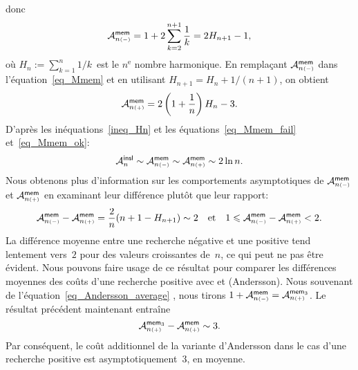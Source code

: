 donc
\begin{equation}
\abovedisplayskip=-6pt
\abovedisplayshortskip=-6pt
\M{\fun{mem}}{n{\scriptscriptstyle (-)}} =
1 + 2 \sum_{k=2}^{n+1}\frac{1}{k} = 2H_{n+1} - 1,
\index{mem@$\M{\fun{mem}}{n{\scriptscriptstyle (-)}}$}
\label{eq_Mmem_fail}
\end{equation}
où \(H_n := \sum_{k=1}^{n}1/k\)~est le \(n^\text{e}\) nombre
harmonique. En remplaçant
\(\M{\fun{mem}}{n{\scriptscriptstyle (-)}}\) dans
l'équation~\eqref{eq_Mmem} et en utilisant \(H_{n+1} = H_n +
1/(n+1)\), on obtient
\begin{equation}
\M{\fun{mem}}{n{\scriptscriptstyle (+)}} =
2\left(1+\frac{1}{n}\right)H_n - 3.
\index{mem@$\M{\fun{mem}}{n{\scriptscriptstyle (+)}}$}
\label{eq_Mmem_ok}
\end{equation}
D'après les inéquations~\eqref{ineq_Hn}  et
les équations~\eqref{eq_Mmem_fail} et~\eqref{eq_Mmem_ok}:
\begin{equation*}
\M{\fun{insl}}{n}
\sim \M{\fun{mem}}{n{\scriptscriptstyle (-)}}
\sim \M{\fun{mem}}{n{\scriptscriptstyle (+)}} \sim 2 \ln n.
\end{equation*}
Nous obtenons plus d'information sur les comportements asymptotiques
de \(\M{\fun{mem}}{n{\scriptscriptstyle(-)}}\) et
\(\M{\fun{mem}}{n{\scriptscriptstyle(+)}}\) en examinant leur
différence plutôt que leur rapport:
\begin{equation*}
\M{\fun{mem}}{n{\scriptscriptstyle (-)}} -
\M{\fun{mem}}{n{\scriptscriptstyle (+)}} =
\frac{2}{n}(n + 1 - H_{n+1}) \sim 2
\quad\text{et}\quad
1 \leqslant \M{\fun{mem}}{n{\scriptscriptstyle (-)}} -
\M{\fun{mem}}{n{\scriptscriptstyle (+)}} < 2.
\end{equation*}
La différence moyenne entre une recherche négative et une positive
tend lentement vers~\(2\) pour des valeurs croissantes de~\(n\), ce
qui peut ne pas être évident. Nous pouvons faire usage de ce résultat
pour comparer les différences moyennes des coûts d'une recherche
positive avec  et  (Andersson). Nous
souvenant de l'équation~\eqref{eq_Andersson_average}
, nous tirons \(1 +
\M{\fun{mem}}{n{\scriptscriptstyle (-)}} =
\M{\fun{mem}_3}{n{\scriptscriptstyle (+)}}\). Le résultat précédent
maintenant entraîne
\begin{equation*}
  \M{\fun{mem}_3}{n{\scriptscriptstyle (+)}} -
  \M{\fun{mem}}{n{\scriptscriptstyle (+)}} \sim 3.
\index{mem3@$\M{\fun{mem}_3}{n{\scriptscriptstyle (+)}}$}
\end{equation*}
Par conséquent, le coût additionnel de la variante d'Andersson dans le
cas d'une recherche positive est asymptotiquement~\(3\), en moyenne.

